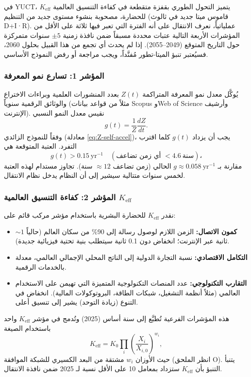 \documentclass[11pt,a4paper]{article}
\begin{document}
	في YUCT، يتميز التحول الطوري بقفزة متقطعة في كفاءة التنسيق العالمية \(K_{\text{eff}}\) للحضارة، مصحوبة بنشوء مستوى جديد من التنظيم (قاموس ميتا جديد في ثالوث D+I·R). عملياتياً، نعرف الانتقال على أنه الفترة التي تعبر فيها ثلاثة على الأقل من المؤشرات الأربعة التالية عتبات محددة مسبقاً ضمن نافذة زمنية \(\pm 5\) سنوات متمركزة حول التاريخ المتوقع (2049–2055). إذا لم يحدث أي تجمع من هذا القبيل بحلول 2060، فسيُعتبر تنبؤ الميتا-تطور مُفنَّداً، ويجب مراجعة أو رفض النموذج الأساسي.
	
	\subsubsection{المؤشر 1: تسارع نمو المعرفة}
	
	يُوكَّل معدل نمو المعرفة المتراكمة \(Z(t)\) بعدد المنشورات العلمية وبراءات الاختراع والوثائق الرقمية سنوياً (مثلاً من قواعد بيانات Scopus وWeb of Science وأرشيف الإنترنت). نقيس معدل النمو النسبي
	\[
	g(t) = \frac{1}{Z}\frac{dZ}{dt}.
	\]
	وفقاً للنموذج الزائدي (معادلة \ref{eq:Z-self-accel})، يجب أن يزداد \(g(t)\) كلما اقترب التفرد. العتبة المتوقعة هي
	\[
	g(t) > 0.15\ \text{yr}^{-1} \quad (\text{أي زمن تضاعف } < 4.6\ \text{سنة})،
	\]
	مقارنة بـ \(g\approx 0.058\ \text{yr}^{-1}\) الحالي (زمن تضاعف \(\approx 12\) سنة). تجاوز مستدام لهذه العتبة لخمس سنوات متتالية سيشير إلى أن النظام يدخل نظام الانتقال.
	
	\subsubsection{المؤشر 2: كفاءة التنسيق العالمية \(K_{\text{eff}}\)}
	
	نقدر \(K_{\text{eff}}\) للحضارة البشرية باستخدام مؤشر مركب قائم على:
	
	\begin{itemize}
		\item \textbf{كمون الاتصال:} الزمن اللازم لوصول رسالة إلى 90\% من سكان العالم (حالياً \(\sim 1\) ثانية عبر الإنترنت؛ انخفاض دون 0.1 ثانية سيتطلب بنية تحتية فيزيائية جديدة).
		\item \textbf{التكامل الاقتصادي:} نسبة التجارة الدولية إلى الناتج المحلي الإجمالي العالمي، معدلة بالخدمات الرقمية.
		\item \textbf{التقارب التكنولوجي:} عدد المنصات التكنولوجية المتميزة التي تهيمن على الاستخدام العالمي (مثلاً أنظمة التشغيل، شبكات الطاقة، البروتوكولات المالية). انخفاض في التنوع (زيادة التوحد) يشير إلى تنسيق أعلى.
	\end{itemize}
	
	هذه المؤشرات الفرعية تُطبَّع إلى سنة أساس (2025) وتُدمج في مؤشر \(K_{\text{eff}}\) واحد باستخدام الصيغة
	\[
	K_{\text{eff}} = K_0 \prod_{i} \left(\frac{X_i}{X_{i,0}}\right)^{w_i},
	\]
	حيث الأوزان \(w_i\) مشتقة من البعد الكسيري للشبكة الموافقة (انظر الملحق O). يتنبأ التنبؤ بأن \(K_{\text{eff}}\) ستزداد بمعامل 10 على الأقل نسبة لـ 2025 ضمن نافذة الانتقال.
	
\end{document}
